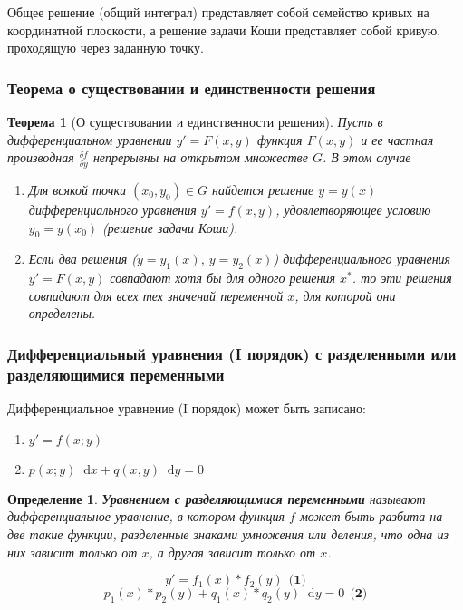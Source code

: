 \documentclass{article}
\newcommand*\diff{\mathop{}\!\mathrm{d}}
\newtheorem{definition}{Определение}
\newtheorem{theorem}{Теорема}
\begin{document}
Общее решение (общий интеграл) представляет собой семейство кривых на координатной плоскости, а решение задачи Коши представляет собой кривую, проходящую через заданную точку.

\subsubsection{Теорема о существовании и единственности решения}

\begin{theorem}[О существовании и единственности решения]
    Пусть в дифференциальном уравнении $y' = F(x, y)$ функция $F(x, y)$ и ее частная производная $\frac{\delta f}{\delta y}$ непрерывны на открытом множестве $G$. В этом случае
    \begin{enumerate}
        \item Для всякой точки $(x_0, y_0) \in G$ найдется решение $y = y(x)$ дифференциального уравнения $y' = f(x, y)$, удовлетворяющее условию $y_0 = y(x_0)$ (решение задачи Коши).
        \item Если два решения ($y = y_1(x)$, $y = y_2(x)$) дифференциального уравнения $y' = F(x, y)$ совпадают хотя бы для одного решения $x^{*}$. то эти решения совпадают для всех тех значений переменной $x$, для которой они определены.
    \end{enumerate}
\end{theorem}

\subsubsection{Дифференциальный уравнения (I порядок) с разделенными или разделяющимися переменными}

Дифференциальное уравнение (I порядок) может быть записано:

\begin{enumerate}
    \item $y' = f(x; y)$
    \item $p(x; y) \diff x + q(x, y) \diff y = 0$
\end{enumerate}

\begin{definition}
    \textbf{Уравнением с разделяющимися переменными} называют дифференциальное уравнение, в котором функция $f$ может быть разбита на две такие функции, разделенные знаками умножения или деления, что одна из них зависит только от $x$, а другая зависит только от $x$.

    $$y' = f_1(x) * f_2(y) \ \ \textbf{(1)}$$
    $$p_1(x) * p_2(y) + q_1(x) * q_2(y) \diff y = 0 \ \ \textbf{(2)}$$
\end{definition}
\end{document}
